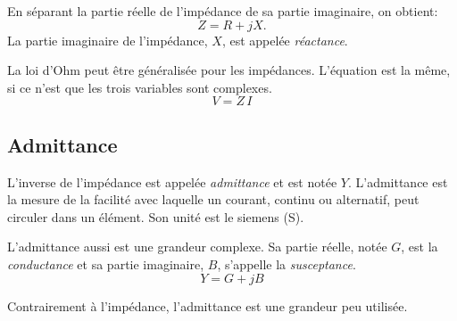 \documentclass[12pt,oneside,letterpaper]{article}
\begin{document}
En séparant la partie réelle de l'impédance de sa partie imaginaire, on obtient:
\begin{equation}
\label{eq-resistance-reactance}
Z=R+jX.
\end{equation}
La partie imaginaire de l'impédance, $X$, est appelée \textit{réactance}.

La loi d'Ohm peut être généralisée pour les impédances. L'équation est la même, si ce n'est que les trois variables sont complexes.
\begin{equation}
\label{eq-loi-ohm-complexe}
V=Z \, I
\end{equation}


\subsection{Admittance}

L'inverse de l'impédance est appelée \textit{admittance} et est notée $Y$. L'admittance est la mesure de la facilité avec laquelle un courant, continu ou alternatif, peut circuler dans un élément. Son unité est le siemens (S).

L'admittance aussi est une grandeur complexe. Sa partie réelle, notée $G$, est la \textit{conductance} et sa partie imaginaire, $B$, s'appelle la \textit{susceptance}.
\begin{equation}
\label{eq-conductance-susceptance}
Y=G+jB
\end{equation}

Contrairement à l'impédance, l'admittance est une grandeur peu utilisée.
\end{document}
